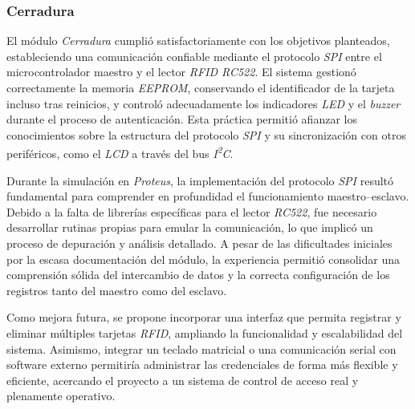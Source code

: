 \subsubsection{Cerradura}

El módulo \textit{Cerradura} cumplió satisfactoriamente con los objetivos planteados, estableciendo una comunicación confiable mediante el protocolo \textit{SPI} entre el microcontrolador maestro y el lector \textit{RFID RC522}. El sistema gestionó correctamente la memoria \textit{EEPROM}, conservando el identificador de la tarjeta incluso tras reinicios, y controló adecuadamente los indicadores \textit{LED} y el \textit{buzzer} durante el proceso de autenticación. Esta práctica permitió afianzar los conocimientos sobre la estructura del protocolo \textit{SPI} y su sincronización con otros periféricos, como el \textit{LCD} a través del bus \textit{I\textsuperscript{2}C}.

Durante la simulación en \textit{Proteus}, la implementación del protocolo \textit{SPI} resultó fundamental para comprender en profundidad el funcionamiento maestro–esclavo. Debido a la falta de librerías específicas para el lector \textit{RC522}, fue necesario desarrollar rutinas propias para emular la comunicación, lo que implicó un proceso de depuración y análisis detallado. A pesar de las dificultades iniciales por la escasa documentación del módulo, la experiencia permitió consolidar una comprensión sólida del intercambio de datos y la correcta configuración de los registros tanto del maestro como del esclavo.

Como mejora futura, se propone incorporar una interfaz que permita registrar y eliminar múltiples tarjetas \textit{RFID}, ampliando la funcionalidad y escalabilidad del sistema. Asimismo, integrar un teclado matricial o una comunicación serial con software externo permitiría administrar las credenciales de forma más flexible y eficiente, acercando el proyecto a un sistema de control de acceso real y plenamente operativo.
